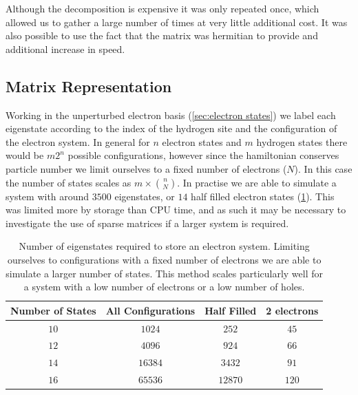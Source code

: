 Although the decomposition is
expensive it was only repeated once,
which allowed us to gather a large
number of times at very little additional
cost. It was also possible to use the
fact that the matrix was hermitian to
provide and additional increase in speed.

\subsection{Matrix Representation}\label{sec:state representation}
Working in the unperturbed electron basis
(\cref{sec:electron states})
we label each eigenstate
according to the index of the
hydrogen site and
the configuration of the
electron system.
In general for \(n\)
electron states
and \(m\) hydrogen states
there would
be \(m 2^n\)
possible configurations,
however since the hamiltonian
conserves particle number
we limit ourselves
to a fixed
number of electrons (\(N\)).
In this case the number
of states scales as \(m \times{} \binom{n}{N}\).
In practise we are able to
simulate a system with
around \(3500\) eigenstates,
or \(14\) half filled electron states
(\cref{tab:number of eigenstates}).
This was limited more by
storage than CPU time, and as such it may
be necessary to investigate
the use of sparse matrices if a
larger system is required.
\begin{table}[htbp]
    \begin{center}
        \begin{tabular}{ *{4}{c} }
            \toprule
            Number of States & All Configurations & Half Filled & 2 electrons \\
            \midrule
            \(10\)           & \(1024\)           & \(252\)     & \(45\)      \\
            \(12\)           & \(4096\)           & \(924\)     & \(66\)      \\
            \(14\)           & \(16384\)          & \(3432\)    & \(91\)      \\
            \(16\)           & \(65536\)          & \(12870\)   & \(120\)     \\
            \bottomrule
        \end{tabular}
    \end{center}
    \caption{
        Number of eigenstates required
        to store an electron system.
        Limiting ourselves to
        configurations with a fixed
        number of electrons we are
        able to simulate a larger
        number of states.
        This method scales particularly
        well for a system with a
        low number of electrons
        or a low number of holes.
    }\label{tab:number of eigenstates}
\end{table}

